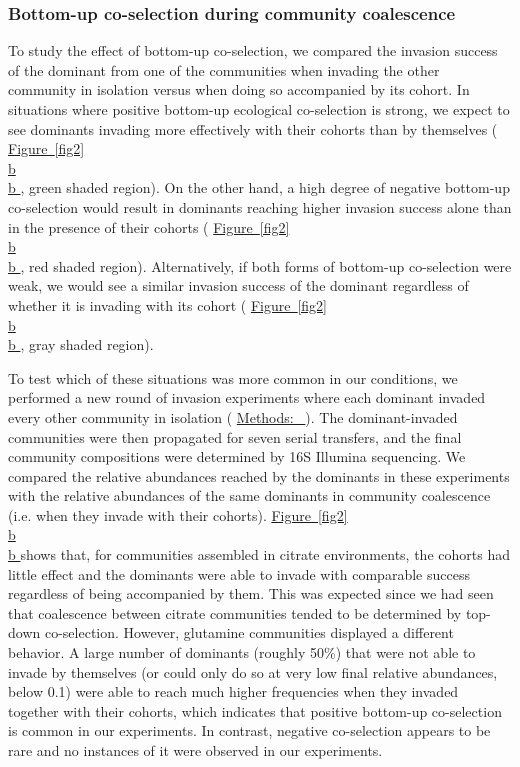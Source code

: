 \documentclass[a4paper,10pt]{article}
\newcommand{\figref}[2][]{%
  \hyperref[{#2}]{%
    Figure~\ref*{#2}%
    \ifx\\#1\\%
    \else
      #1%
    \fi
  }%
}
\newcommand{\methodsref}[1]{%
  \hyperref[{methods:#1}]{%
   Methods:~\nameref*{methods:#1}%
  }%
}
\begin{document}
\subsubsection*{Bottom-up co-selection during community coalescence}

To study the effect of bottom-up co-selection, we compared the invasion success of the dominant
from one of the communities when invading the other community in isolation versus when doing so
accompanied by its cohort.
In situations where positive bottom-up ecological co-selection is strong, we expect to see dominants
invading more effectively with their cohorts than by themselves
(\figref[b]{fig2}, green shaded region).
On the other hand, a high degree of negative bottom-up co-selection would result in dominants reaching
higher invasion success alone than in the presence of their cohorts
(\figref[b]{fig2}, red shaded region).
Alternatively, if both forms of bottom-up co-selection were weak, we would see a similar invasion
success of the dominant regardless of whether it is invading with its cohort
(\figref[b]{fig2}, gray shaded region).

To test which of these situations was more common in our conditions,
we performed a new round of invasion experiments where each dominant invaded every
other community in isolation (\methodsref{competitions}). The dominant-invaded
communities were then propagated for seven serial transfers, and the final
community compositions were determined by 16S Illumina sequencing.
We compared the relative abundances reached by the dominants in these experiments
with the relative abundances of the same dominants in community coalescence
(i.e. when they invade with their cohorts).
\figref[b]{fig2} shows that, for communities assembled in citrate environments,
the cohorts had little effect and the dominants were able to invade with comparable
success regardless of being accompanied by them.
This was expected since we had seen that coalescence between citrate communities
tended to be determined by top-down co-selection.
However, glutamine communities displayed a different behavior.
A large number of dominants (roughly 50\%) that were not able to invade by themselves
(or could only do so at very low final relative abundances, below 0.1)
were able to reach much higher frequencies when they invaded together with their cohorts,
which indicates that positive bottom-up co-selection is common in our experiments.
In contrast, negative co-selection appears to be rare and no instances of it were
observed in our experiments.
\end{document}
